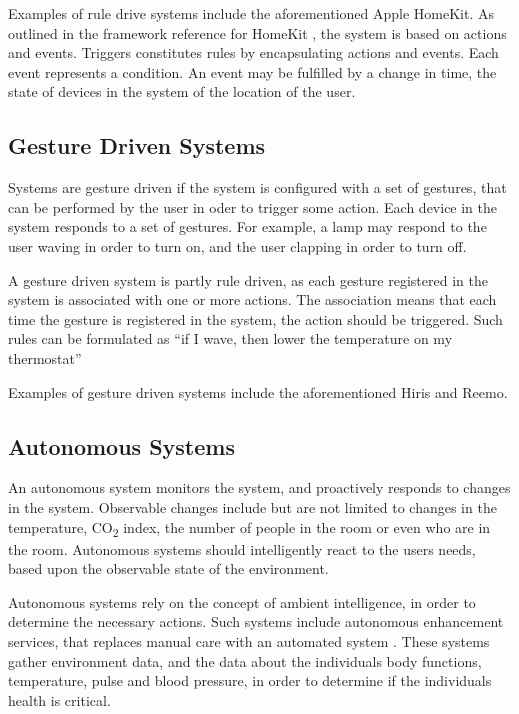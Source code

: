 Examples of rule drive systems include the aforementioned Apple HomeKit. 
As outlined in the framework reference for HomeKit \cite{applehomekitref}, 
the system is based on actions and events. 
Triggers constitutes rules by encapsulating actions and events. 
Each event represents a condition. 
An event may be fulfilled by a change in time, 
the state of devices in the system of the location of the user.

\subsection{Gesture Driven Systems}

Systems are gesture driven if the system is configured with a set of gestures, 
that can be performed by the user in oder to trigger some action. 
Each device in the system responds to a set of gestures. 
For example, a lamp may respond to the user waving in order to turn on, 
and the user clapping in order to turn off.

A gesture driven system is partly rule driven, 
as each gesture registered in the system is associated with one or more actions. 
The association means that each time the gesture is registered in the system, the action should be triggered. 
Such rules can be formulated as ``if I wave, then lower the temperature on my thermostat''

Examples of gesture driven systems include the aforementioned Hiris and Reemo.

\subsection{Autonomous Systems}

An autonomous system monitors the system, 
and proactively responds to changes in the system. 
Observable changes include but are not limited to changes in the temperature, 
CO\textsubscript{2} index, the number of people in the room or even who are in the room.
Autonomous systems should intelligently react to the users needs, 
based upon the observable state of the environment.

Autonomous systems rely on the concept of ambient intelligence, 
in order to determine the necessary actions.
Such systems include autonomous enhancement services, 
that replaces manual care with an automated system \cite{nehmer2006living}. 
These systems gather environment data, 
and the data about the individuals body functions, 
\eg temperature, pulse and blood pressure, 
in order to determine if the individuals health is critical.

